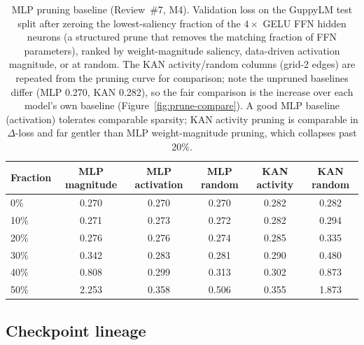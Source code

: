 \documentclass{article}
\begin{document}
\begin{table}[htbp]
\centering
\caption{MLP pruning baseline (Review~\#7, M4). Validation loss on the GuppyLM test split after zeroing the lowest-saliency fraction of the \(4\times\) GELU FFN hidden neurons (a structured prune that removes the matching fraction of FFN parameters), ranked by weight-magnitude saliency, data-driven activation magnitude, or at random. The KAN activity/random columns (grid-2 edges) are repeated from the pruning curve for comparison; note the unpruned baselines differ (MLP 0.270, KAN 0.282), so the fair comparison is the increase over each model's own baseline (Figure~\ref{fig:prune-compare}). A good MLP baseline (activation) tolerates comparable sparsity; KAN activity pruning is comparable in \(\Delta\)-loss and far gentler than MLP weight-magnitude pruning, which collapses past 20\%.}
\label{tab:prune-mlp}
\begin{tabular}{@{}lccccc@{}}
\toprule
Fraction & MLP magnitude & MLP activation & MLP random & KAN activity & KAN random \\
\midrule
0\%  & 0.270 & 0.270 & 0.270 & 0.282 & 0.282 \\
10\% & 0.271 & 0.273 & 0.272 & 0.282 & 0.294 \\
20\% & 0.276 & 0.276 & 0.274 & 0.285 & 0.335 \\
30\% & 0.342 & 0.283 & 0.281 & 0.290 & 0.480 \\
40\% & 0.808 & 0.299 & 0.313 & 0.302 & 0.873 \\
50\% & 2.253 & 0.358 & 0.506 & 0.355 & 1.873 \\
\bottomrule
\end{tabular}
\end{table}

\subsection{Checkpoint lineage}
\end{document}
